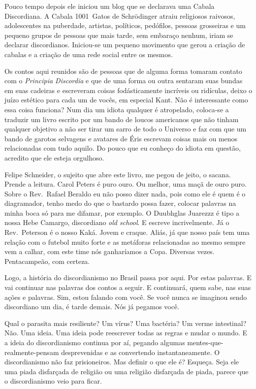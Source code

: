 Pouco tempo depois ele iniciou um blog que se declarava uma Cabala Discordiana. A Cabala 1001~Gatos de Schrödinger atraiu religiosos raivosos, adolescentes na puberdade, artistas, políticos, pedófilos, pessoas grosseiras e um pequeno grupos de pessoas que mais tarde, sem embaraço nenhum, iriam se declarar discordianos. Iniciou-se um pequeno movimento que gerou a criação de cabalas e a criação de uma rede social entre os mesmos.

Os contos aqui reunidos são de pessoas que de alguma forma tomaram contato com o \emph{Principia Discordia} e que de uma forma ou outra sentaram suas bundas em suas cadeiras e escreveram coisas fodásticamente incríveis ou ridículas, deixo o juízo estético para cada um de vocês, em especial Kant. Não é interessante como essa coisa funciona? Num dia um idiota qualquer é atropelado, coloca-se a traduzir um livro escrito por um bando de loucos americanos que não tinham qualquer objetivo a não ser tirar um sarro de todo o Universo e faz com que um bando de garotos selvagens e avatares de Éris escrevam coisas mais ou menos relacionadas com tudo aquilo. Do pouco que eu conheço do idiota em questão, acredito que ele esteja orgulhoso.

Felipe Schneider, o sujeito que abre este livro, me pegou de jeito, o sacana. Prende a leitura. Carol Peters é puro ouro. Ou melhor, uma maçã de ouro puro. Sobre o Rev.~Rafael Beraldo eu não posso dizer nada, pois como ele é quem é o diagramador, tenho medo do que o bastardo possa fazer, colocar palavras na minha boca só para me difamar, por exemplo. O Duubhglas Juarezzz é tipo a nossa Hebe Camargo, discordiano \foreignlanguage{english}{\emph{old school}}. E escreve incrivelmente. Já o Rev.~Peterson é o nosso Kaká. Jovem e craque. Aliás, já que nosso país tem uma relação com o futebol muito forte e as metáforas relacionadas ao mesmo sempre vem a calhar, com este time nós ganharíamos a Copa. Diversas vezes. Pentacampeão, com certeza.

Logo, a história do discordianismo no Brasil passa por aqui. Por estas palavras. E vai continuar nas palavras dos contos a seguir. E continuará, quem sabe, nas suas ações e palavras. Sim, estou falando com você. Se você nunca se imaginou sendo discordiano um dia, é tarde demais. Nós já pegamos você.

Qual o parasita mais resiliente? Um vírus? Uma bactéria? Um verme intestinal? Não. Uma ideia. Uma ideia pode reescrever todas as regras e mudar o mundo. E a ideia do discordianismo continua por aí, pegando algumas mentes-que-realmente-pensam desprevenidas e as convertendo instantaneamente. O discordianismo não faz prisioneiros. Mas definir o que ele é? Esqueça. Seja ele uma piada disfarçada de religião ou uma religião disfarçada de piada, parece que o discordianismo veio para ficar.

